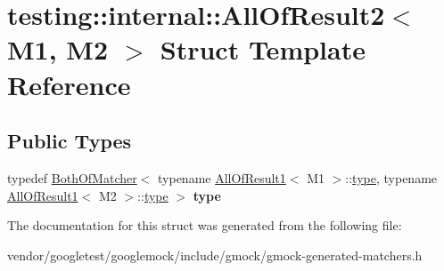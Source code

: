\hypertarget{structtesting_1_1internal_1_1_all_of_result2}{}\section{testing\+:\+:internal\+:\+:All\+Of\+Result2$<$ M1, M2 $>$ Struct Template Reference}
\label{structtesting_1_1internal_1_1_all_of_result2}
\subsection*{Public Types}
\begin{DoxyCompactItemize}
\item 
\mbox{\label{structtesting_1_1internal_1_1_all_of_result2_adec0b0ce2fdd07d398e1fdd2cdb88392}} 
typedef \mbox{\hyperlink{classtesting_1_1internal_1_1_both_of_matcher}{Both\+Of\+Matcher}}$<$ typename \mbox{\hyperlink{structtesting_1_1internal_1_1_all_of_result1}{All\+Of\+Result1}}$<$ M1 $>$\+::\mbox{\hyperlink{classtesting_1_1internal_1_1_both_of_matcher}{type}}, typename \mbox{\hyperlink{structtesting_1_1internal_1_1_all_of_result1}{All\+Of\+Result1}}$<$ M2 $>$\+::\mbox{\hyperlink{classtesting_1_1internal_1_1_both_of_matcher}{type}} $>$ {\bfseries type}
\end{DoxyCompactItemize}


The documentation for this struct was generated from the following file\+:\begin{DoxyCompactItemize}
\item 
vendor/googletest/googlemock/include/gmock/gmock-\/generated-\/matchers.\+h\end{DoxyCompactItemize}
